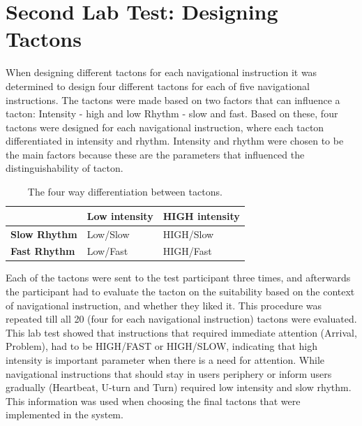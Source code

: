 \documentclass{sigchi}
\begin{document}
\section{Second Lab Test: Designing Tactons}
When designing different tactons for each navigational instruction it was determined to design four different tactons for each of five navigational instructions. The tactons were made based on two factors that can influence a tacton:\newline
Intensity - high and low 
Rhythm - slow and fast.
Based on these, four tactons were designed for each navigational instruction, where each tacton differentiated in intensity and rhythm. Intensity and rhythm were chosen to be the main factors because these are the parameters that influenced the distinguishability of tacton. 
\newline
\newline
\begin{table}
\centering
\small
\begin{tabular} {p{2.0cm}p{2.0cm}p{2.0cm}}
\toprule
 & \textbf{Low intensity} & \textbf{HIGH intensity}  
\tabularnewline 
\midrule
\textbf{Slow Rhythm} & Low/Slow & HIGH/Slow  
\vspace{0.1cm} \tabularnewline
\textbf{Fast Rhythm} & Low/Fast & HIGH/Fast 
\vspace{0.1cm} 
\tabularnewline
\bottomrule
\end{tabular}
\caption{The four way differentiation between tactons.}
\label{tab:stage_two_tacton_design}
\end{table}
\newline
\newline
Each of the tactons were sent to the test participant three times, and afterwards the participant had to evaluate the tacton on the suitability based on the context of navigational instruction, and whether they liked it. This procedure was repeated till all 20 (four for each navigational instruction) tactons were evaluated.
\newline
\newline
This lab test showed that instructions that required immediate attention (Arrival, Problem), had to be HIGH/FAST or HIGH/SLOW, indicating that high intensity is important parameter when there is a need for attention. 
While navigational instructions that should stay in users periphery or inform users gradually (Heartbeat, U-turn and Turn) required low intensity and slow rhythm. This information was used when choosing the final tactons that were implemented in the system.  
\end{document}
